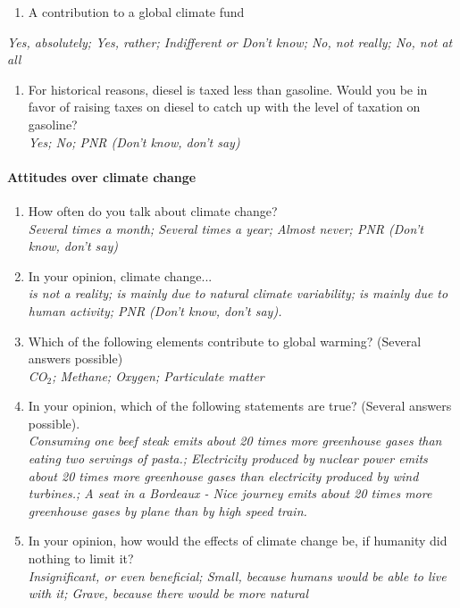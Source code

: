 \documentclass[english,5p,authoryear]{elsarticle}
\begin{document}
\begin{appendices}
\begin{enumerate}[resume,leftmargin=*]
\begin{enumerate}[resume,leftmargin=*]
\item A contribution to a global climate fund 
\end{enumerate}
\end{enumerate}
\emph{Yes, absolutely; Yes, rather; Indifferent or Don't know; No,
not really; No, not at all}
\begin{enumerate}[resume,leftmargin=*]
\item For historical reasons, diesel is taxed less than gasoline. Would
you be in favor of raising taxes on diesel to catch up with the level
of taxation on gasoline? \emph{}\\
\emph{Yes; No; PNR (Don't know, don't say) }
\end{enumerate}

\paragraph{Attitudes over climate change}
\begin{enumerate}[resume,leftmargin=*]
\item How often do you talk about climate change? \emph{}\\
\emph{Several times a month; Several times a year; Almost never; PNR
(Don't know, don't say) }
\item In your opinion, climate change... \emph{}\\
\emph{is not a reality; is mainly due to natural climate variability;
is mainly due to human activity; PNR (Don't know, don't say). }
\item Which of the following elements contribute to global warming? (Several
answers possible) \emph{}\\
\emph{CO$_{2}$; Methane; Oxygen; Particulate matter}
\item In your opinion, which of the following statements are true? (Several
answers possible). \emph{}\\
\emph{Consuming one beef steak emits about 20 times more greenhouse
gases than eating two servings of pasta.; Electricity produced by
nuclear power emits about 20 times more greenhouse gases than electricity
produced by wind turbines.; A seat in a Bordeaux - Nice journey emits
about 20 times more greenhouse gases by plane than by high speed train. }
\item In your opinion, how would the effects of climate change be, if humanity
did nothing to limit it? \emph{}\\
\emph{Insignificant, or even beneficial; Small, because humans would
be able to live with it; Grave, because there would be more natural
}
\end{enumerate}
\end{appendices}
\end{document}
